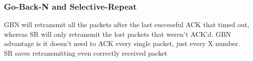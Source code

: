 \documentclass[12pt, a4paper]{article}
\begin{document}
\subsubsection{Go-Back-N and Selective-Repeat}
GBN will retransmit all the packets after the last successful ACK that timed out, whereas SR will only retransmit the lost packets that weren't ACK'd. GBN advantage is it doesn't need to ACK every single packet, just every X number. SR saves retransmitting even correctly received packet
\end{document}
